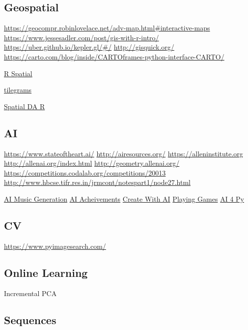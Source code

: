 \documentclass[]{book}
\begin{document}
\hypertarget{geospatial}{%
\subsection{Geospatial}\label{geospatial}}

\url{https://geocompr.robinlovelace.net/adv-map.html\#interactive-maps} \url{https://www.jessesadler.com/post/gis-with-r-intro/} \url{https://uber.github.io/kepler.gl/\#/} \url{http://gisquick.org/} \url{https://carto.com/blog/inside/CARTOframes-python-interface-CARTO/}

\href{http://www.rspatial.org/analysis/rst/2-scale_distance.html}{R Spatial}

\href{https://pitchinteractiveinc.github.io/tilegrams/}{tilegrams}

\href{https://data.cdrc.ac.uk/tutorial/an-introduction-to-spatial-data-analysis-and-visualisation-in-r}{Spatial DA R}

\hypertarget{ai}{%
\subsection{AI}\label{ai}}

\url{https://www.stateoftheart.ai/} \url{http://airesources.org/} \url{https://alleninstitute.org} \url{http://allenai.org/index.html} \url{http://geometry.allenai.org/} \url{https://competitions.codalab.org/competitions/20013} \url{http://www.hbcse.tifr.res.in/jrmcont/notespart1/node27.html}

\href{https://www.jukedeck.com}{AI Music Generation} \href{https://poo.ai/}{AI Acheivements} \href{http://createwith.ai/}{Create With AI} \href{http://www.ggp.org/}{Playing Games} \href{https://wiki.python.org/moin/PythonForArtificialIntelligence}{AI 4 Py}

\hypertarget{cv}{%
\subsection{CV}\label{cv}}

\url{https://www.pyimagesearch.com/}

\hypertarget{online-learning}{%
\subsection{Online Learning}\label{online-learning}}

Incremental PCA

\hypertarget{sequences}{%
\subsection{Sequences}\label{sequences}}
\end{document}
